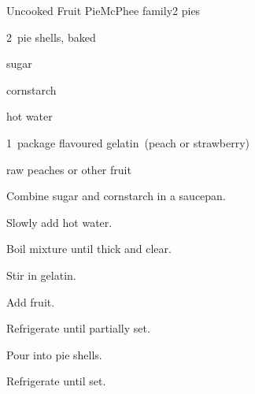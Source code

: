 \begin{recipe}{Uncooked Fruit Pie}{McPhee family}{2 pies}

\begin{ingredients}
\item 2~pie shells, baked
\item {} sugar
\item {} cornstarch
\item \C{1\half} hot water
\item 1~package flavoured gelatin~(peach or strawberry)
\item {} raw peaches or other fruit
\end{ingredients}

\begin{directions}
\item Combine sugar and cornstarch in a saucepan.
\item Slowly add hot water.
\item Boil mixture until thick and clear.
\item Stir in gelatin.
\item Add fruit.
\item Refrigerate until partially set.
\item Pour into pie shells.
\item Refrigerate until set.
\end{directions}

\end{recipe}
